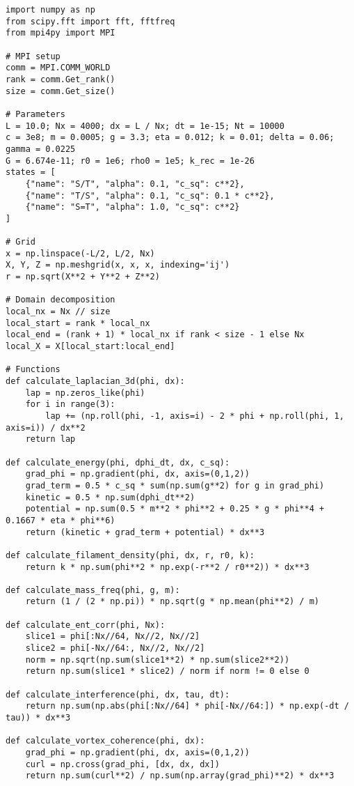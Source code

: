 \documentclass[11pt]{article}
\begin{document}
\begin{lstlisting}
import numpy as np
from scipy.fft import fft, fftfreq
from mpi4py import MPI

# MPI setup
comm = MPI.COMM_WORLD
rank = comm.Get_rank()
size = comm.Get_size()

# Parameters
L = 10.0; Nx = 4000; dx = L / Nx; dt = 1e-15; Nt = 10000
c = 3e8; m = 0.0005; g = 3.3; eta = 0.012; k = 0.01; delta = 0.06; gamma = 0.0225
G = 6.674e-11; r0 = 1e6; rho0 = 1e5; k_rec = 1e-26
states = [
    {"name": "S/T", "alpha": 0.1, "c_sq": c**2},
    {"name": "T/S", "alpha": 0.1, "c_sq": 0.1 * c**2},
    {"name": "S=T", "alpha": 1.0, "c_sq": c**2}
]

# Grid
x = np.linspace(-L/2, L/2, Nx)
X, Y, Z = np.meshgrid(x, x, x, indexing='ij')
r = np.sqrt(X**2 + Y**2 + Z**2)

# Domain decomposition
local_nx = Nx // size
local_start = rank * local_nx
local_end = (rank + 1) * local_nx if rank < size - 1 else Nx
local_X = X[local_start:local_end]

# Functions
def calculate_laplacian_3d(phi, dx):
    lap = np.zeros_like(phi)
    for i in range(3):
        lap += (np.roll(phi, -1, axis=i) - 2 * phi + np.roll(phi, 1, axis=i)) / dx**2
    return lap

def calculate_energy(phi, dphi_dt, dx, c_sq):
    grad_phi = np.gradient(phi, dx, axis=(0,1,2))
    grad_term = 0.5 * c_sq * sum(np.sum(g**2) for g in grad_phi)
    kinetic = 0.5 * np.sum(dphi_dt**2)
    potential = np.sum(0.5 * m**2 * phi**2 + 0.25 * g * phi**4 + 0.1667 * eta * phi**6)
    return (kinetic + grad_term + potential) * dx**3

def calculate_filament_density(phi, dx, r, r0, k):
    return k * np.sum(phi**2 * np.exp(-r**2 / r0**2)) * dx**3

def calculate_mass_freq(phi, g, m):
    return (1 / (2 * np.pi)) * np.sqrt(g * np.mean(phi**2) / m)

def calculate_ent_corr(phi, Nx):
    slice1 = phi[:Nx//64, Nx//2, Nx//2]
    slice2 = phi[-Nx//64:, Nx//2, Nx//2]
    norm = np.sqrt(np.sum(slice1**2) * np.sum(slice2**2))
    return np.sum(slice1 * slice2) / norm if norm != 0 else 0

def calculate_interference(phi, dx, tau, dt):
    return np.sum(np.abs(phi[:Nx//64] * phi[-Nx//64:]) * np.exp(-dt / tau)) * dx**3

def calculate_vortex_coherence(phi, dx):
    grad_phi = np.gradient(phi, dx, axis=(0,1,2))
    curl = np.cross(grad_phi, [dx, dx, dx])
    return np.sum(curl**2) / np.sum(np.array(grad_phi)**2) * dx**3


\end{lstlisting}
\end{document}
